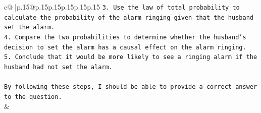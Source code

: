 \documentclass{article}
\begin{document}
{\begin{supertabular}{c@{$\;$}|p{.15\linewidth}@{}p{.15\linewidth}p{.15\linewidth}p{.15\linewidth}p{.15\linewidth}p{.15\linewidth}}
{{{\texttt{3. Use the law of total probability to calculate the probability of the alarm ringing given that the husband set the alarm.} \\
\texttt{4. Compare the two probabilities to determine whether the husband's decision to set the alarm has a causal effect on the alarm ringing.} \\
\texttt{5. Conclude that it would be more likely to see a ringing alarm if the husband had not set the alarm.} \\
\\ 
\texttt{By following these steps, I should be able to provide a correct answer to the question.} \\
            }
        }
    }
    & \\ \\

\end{supertabular}
}
\end{document}
